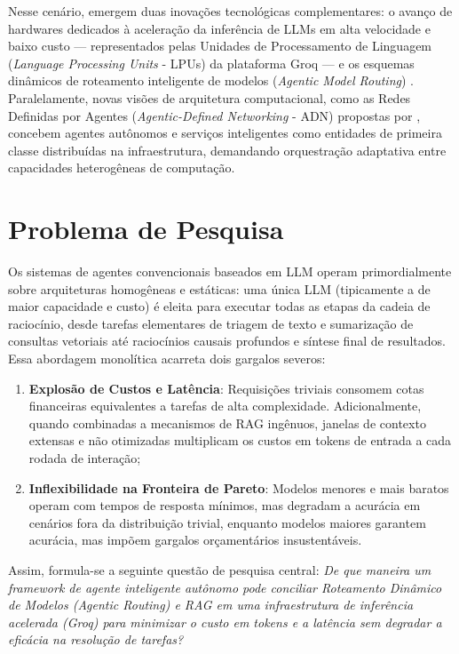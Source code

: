 Nesse cenário, emergem duas inovações tecnológicas complementares: o avanço de hardwares dedicados à aceleração da inferência de LLMs em alta velocidade e baixo custo --- representados pelas Unidades de Processamento de Linguagem (\textit{Language Processing Units} - LPUs) da plataforma Groq \cite{groq2024lpu} --- e os esquemas dinâmicos de roteamento inteligente de modelos (\textit{Agentic Model Routing}) \cite{lance2026agentasrouter}. Paralelamente, novas visões de arquitetura computacional, como as Redes Definidas por Agentes (\textit{Agentic-Defined Networking} - ADN) propostas por , concebem agentes autônomos e serviços inteligentes como entidades de primeira classe distribuídas na infraestrutura, demandando orquestração adaptativa entre capacidades heterogêneas de computação.

\section{Problema de Pesquisa}

Os sistemas de agentes convencionais baseados em LLM operam primordialmente sobre arquiteturas homogêneas e estáticas: uma única LLM (tipicamente a de maior capacidade e custo) é eleita para executar todas as etapas da cadeia de raciocínio, desde tarefas elementares de triagem de texto e sumarização de consultas vetoriais até raciocínios causais profundos e síntese final de resultados. Essa abordagem monolítica acarreta dois gargalos severos:

\begin{enumerate}
    \item \textbf{Explosão de Custos e Latência}: Requisições triviais consomem cotas financeiras equivalentes a tarefas de alta complexidade. Adicionalmente, quando combinadas a mecanismos de RAG ingênuos, janelas de contexto extensas e não otimizadas multiplicam os custos em tokens de entrada a cada rodada de interação;
    \item \textbf{Inflexibilidade na Fronteira de Pareto}: Modelos menores e mais baratos operam com tempos de resposta mínimos, mas degradam a acurácia em cenários fora da distribuição trivial, enquanto modelos maiores garantem acurácia, mas impõem gargalos orçamentários insustentáveis.
\end{enumerate}

Assim, formula-se a seguinte questão de pesquisa central: \textit{De que maneira um framework de agente inteligente autônomo pode conciliar Roteamento Dinâmico de Modelos (Agentic Routing) e RAG em uma infraestrutura de inferência acelerada (Groq) para minimizar o custo em tokens e a latência sem degradar a eficácia na resolução de tarefas?}

